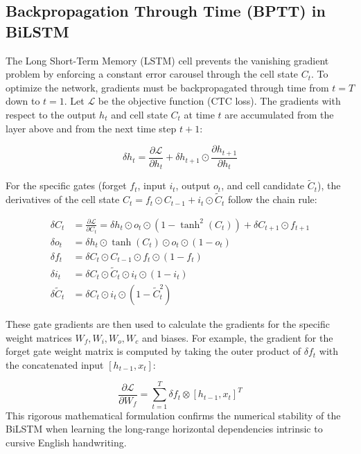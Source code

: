 \subsection{Backpropagation Through Time (BPTT) in BiLSTM}
The Long Short-Term Memory (LSTM) cell prevents the vanishing gradient problem by enforcing a constant error carousel through the cell state $C_t$. To optimize the network, gradients must be backpropagated through time from $t=T$ down to $t=1$. Let $\mathcal{L}$ be the objective function (CTC loss). The gradients with respect to the output $h_t$ and cell state $C_t$ at time $t$ are accumulated from the layer above and from the next time step $t+1$:

\begin{equation}
    \delta h_t = \frac{\partial \mathcal{L}}{\partial h_t} + \delta h_{t+1} \odot \frac{\partial h_{t+1}}{\partial h_t}
\end{equation}

For the specific gates (forget $f_t$, input $i_t$, output $o_t$, and cell candidate $\tilde{C}_t$), the derivatives of the cell state $C_t = f_t \odot C_{t-1} + i_t \odot \tilde{C}_t$ follow the chain rule:

\begin{align}
    \delta C_t &= \frac{\partial \mathcal{L}}{\partial C_t} = \delta h_t \odot o_t \odot (1 - \tanh^2(C_t)) + \delta C_{t+1} \odot f_{t+1} \\
    \delta o_t &= \delta h_t \odot \tanh(C_t) \odot o_t \odot (1 - o_t) \\
    \delta f_t &= \delta C_t \odot C_{t-1} \odot f_t \odot (1 - f_t) \\
    \delta i_t &= \delta C_t \odot \tilde{C}_t \odot i_t \odot (1 - i_t) \\
    \delta \tilde{C}_t &= \delta C_t \odot i_t \odot (1 - \tilde{C}_t^2)
\end{align}

These gate gradients are then used to calculate the gradients for the specific weight matrices $W_f, W_i, W_o, W_c$ and biases. For example, the gradient for the forget gate weight matrix is computed by taking the outer product of $\delta f_t$ with the concatenated input $[h_{t-1}, x_t]$:

\begin{equation}
    \frac{\partial \mathcal{L}}{\partial W_f} = \sum_{t=1}^T \delta f_t \otimes [h_{t-1}, x_t]^T
\end{equation}
This rigorous mathematical formulation confirms the numerical stability of the BiLSTM when learning the long-range horizontal dependencies intrinsic to cursive English handwriting.

